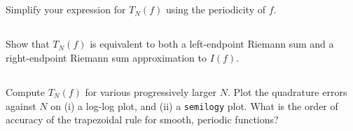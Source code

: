 \documentclass[11pt,letterpaper]{article}
\begin{document}
\subsection{}
Simplify your expression for $T_N(f)$ using the periodicity of $f$.

\subsection{}
Show that $T_N(f)$ is equivalent to both a left-endpoint Riemann sum and a right-endpoint Riemann sum approximation to $I(f)$.

\subsection{}
Compute $T_N(f)$ for various progressively larger $N$. Plot the quadrature errors against $N$ on (i) a log-log plot, and (ii) a \texttt{semilogy} plot. What is the order of accuracy of the trapezoidal rule for smooth, periodic functions?


% 
% 
\end{document}

